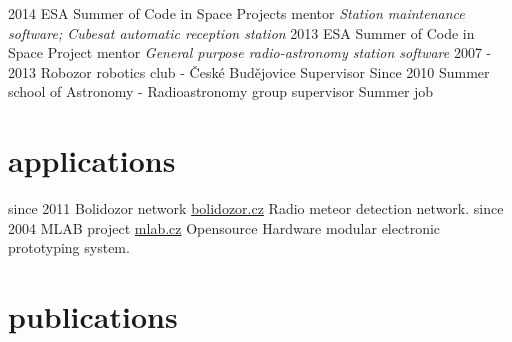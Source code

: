 \documentclass[]{friggeri-cv}
\begin{document}
\begin{entrylist}
  \entry
    {2014}
    {ESA Summer of Code in Space}
    {Projects mentor}
    {\emph{Station maintenance software; Cubesat automatic reception station}}
  \entry
    {2013}
    {ESA Summer of Code in Space}
    {Project mentor}
    {\emph{General purpose radio-astronomy station software}}
  \entry
    {2007 - 2013}
    {Robozor robotics club - České Budějovice}
    {Supervisor}
    {}
  \entry
    {Since 2010}
    {Summer school of Astronomy - Radioastronomy group supervisor}
    {Summer job}
    {}
\end{entrylist}

\section{applications}

\begin{entrylist}
  \entry
    {since 2011}
    {Bolidozor network}
    {\href{http://wiki.bolidozor.cz/}{bolidozor.cz}}
    {Radio meteor detection network.}
  \entry
    {since 2004}
    {MLAB project}
    {\href{http://wiki.mlab.cz/}{mlab.cz}}
    {Opensource Hardware modular electronic prototyping system.}

\end{entrylist}

\section{publications}


\begin{refsection}
  \nocite{*}
  \printbibliography[sorting=chronological, type=inproceedings, title={international peer-reviewed conferences/proceedings}, notkeyword={france}, heading=subbibliography]
\end{refsection}
\begin{refsection}
  \nocite{*}
  \printbibliography[sorting=chronological, type=inproceedings, title={local peer-reviewed conferences/proceedings}, keyword={france}, heading=subbibliography]
\end{refsection}
\end{document}
